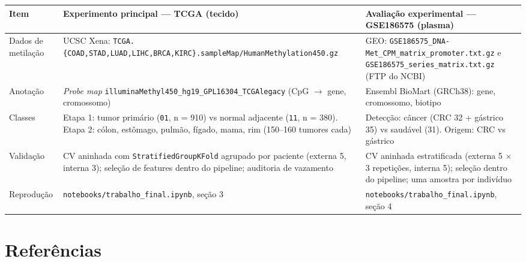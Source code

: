 \documentclass[11pt,a4paper]{article}
\begin{document}
{\def\LTcaptype{none} %
\begin{longtable}[]{@{}
  >{\raggedright\arraybackslash}p{}
  >{\raggedright\arraybackslash}p{}
  >{\raggedright\arraybackslash}p{}@{}}
\toprule\noalign{}
\begin{minipage}[b]{\linewidth}\raggedright
Item
\end{minipage} & \begin{minipage}[b]{\linewidth}\raggedright
Experimento principal --- TCGA (tecido)
\end{minipage} & \begin{minipage}[b]{\linewidth}\raggedright
Avaliação experimental --- GSE186575 (plasma)
\end{minipage} \\
\midrule\noalign{}
\endhead
\bottomrule\noalign{}
\endlastfoot
Dados de metilação & UCSC Xena:
\texttt{TCGA.\{COAD,STAD,LUAD,LIHC,BRCA,KIRC\}.sampleMap/HumanMethylation450.gz}
& GEO: \texttt{GSE186575\_DNA-Met\_CPM\_matrix\_promoter.txt.gz} e
\texttt{GSE186575\_series\_matrix.txt.gz} (FTP do NCBI) \\
Anotação & \emph{Probe map}
\texttt{illuminaMethyl450\_hg19\_GPL16304\_TCGAlegacy} (CpG $\rightarrow$ gene, cromossomo)
& Ensembl BioMart (GRCh38): gene, cromossomo, biotipo \\
Classes & Etapa 1: tumor primário (\texttt{01}, n = 910) vs normal adjacente
(\texttt{11}, n = 380). Etapa 2: cólon, estômago, pulmão, fígado, mama, rim
(150--160 tumores cada) & Detecção: câncer (CRC 32 + gástrico 35) vs saudável
(31). Origem: CRC vs gástrico \\
Validação & CV aninhada com \texttt{StratifiedGroupKFold} agrupado por paciente
(externa 5, interna 3); seleção de features dentro do pipeline; auditoria de
vazamento & CV aninhada estratificada (externa 5 $\times$ 3 repetições, interna 5);
seleção dentro do pipeline; uma amostra por indivíduo \\
Reprodução & \texttt{notebooks/trabalho\_final.ipynb}, seção 3 &
\texttt{notebooks/trabalho\_final.ipynb}, seção 4 \\
\end{longtable}
}

\section*{Referências}
\end{document}
